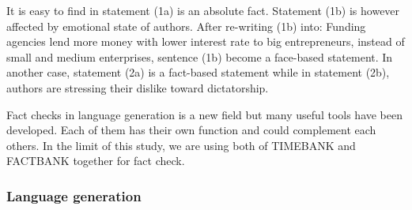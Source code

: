 It is easy to find in statement (1a) is an absolute fact. 
Statement (1b) is however affected by emotional state of authors. 
After re-writing (1b) into: Funding agencies lend more money with lower interest rate to big entrepreneurs, instead of small and medium enterprises, sentence (1b) become a face-based statement. 
In another case, statement (2a) is a fact-based statement while in statement (2b), authors are stressing their dislike toward dictatorship.

Fact checks in language generation is a new field but many useful tools have been developed. 
Each of them has their own function and could complement each others. 
In the limit of this study, we are using both of TIMEBANK and FACTBANK together for fact check.



\subsubsection*{Language generation}


